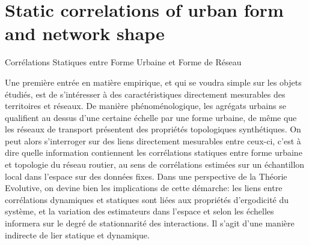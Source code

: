 

\newpage





\section[Static Correlations][Corrélations Statiques]{Static correlations of urban form and network shape}{Corrélations Statiques entre Forme Urbaine et Forme de Réseau}

\label{sec:staticcorrelations}





Une première entrée en matière empirique, et qui se voudra simple sur les objets étudiés, est de s'intéresser à des caractéristiques directement mesurables des territoires et réseaux. De manière phénoménologique, les agrégats urbains se qualifient au dessus d'une certaine échelle par une forme urbaine, de même que les réseaux de transport présentent des propriétés topologiques synthétiques. On peut alors s'interroger sur des liens directement mesurables entre ceux-ci, c'est à dire quelle information contiennent les corrélations statiques entre forme urbaine et topologie du réseau routier, au sens de corrélations estimées sur un échantillon local dans l'espace sur des données fixes. Dans une perspective de la Théorie Evolutive, on devine bien les implications de cette démarche: les liens entre corrélations dynamiques et statiques sont liées aux propriétés d'ergodicité du système, et la variation des estimateurs dans l'espace et selon les échelles informera sur le degré de stationnarité des interactions. Il s'agit d'une manière indirecte de lier statique et dynamique.






